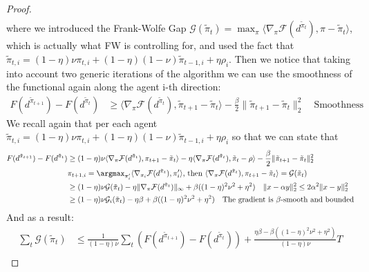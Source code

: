 \begin{proof}
\begin{align*}
    \end{align*}
    where we introduced the  Frank-Wolfe Gap $\mathcal G(\tilde \pi_{t})= \max_{\pi}\langle\nabla_{\pi}\mathcal F (d^{\tilde \pi_{t}}), \pi  - \tilde \pi_{t}\rangle$, which is actually what FW is controlling for, and used the fact that $\tilde \pi_{t,i} = (1-\eta)\nu \pi_{t,i} + (1-\eta)(1-\nu) \tilde \pi_{t-1,i} + \eta \rho_i$. Then we notice that taking into account two generic iterations of the algorithm we can use the smoothness of the functional again along the agent i-th direction:
    \begin{align*}
         F(d^{\tilde \pi_{t+1}}) -F(d^{\tilde \pi_{t}}) 
        &\geq  \langle\nabla_{\pi}\mathcal F (d^{\tilde \pi_{t}}),  \tilde \pi_{t+1}-\tilde \pi_{t}\rangle - \frac{\beta}{2}\|\tilde \pi_{t +1} - \tilde \pi_{t} \|_2^2\quad \text{Smoothness}
    \end{align*}
    We recall again that per each agent $\tilde \pi_{t,i} = (1-\eta)\nu \pi_{t,i} + (1-\eta)(1-\nu) \tilde \pi_{t-1,i} + \eta \rho_i$ so that we can state that 
    \begin{align*}
         F(d^{\tilde \pi_{t+1}}) -F(d^{\tilde \pi_{t}}) 
         &\geq (1-\eta)\nu  \langle\nabla_{\pi}\mathcal F (d^{\tilde \pi_{t}}), \pi_{t+1}- \tilde \pi_{t}\rangle -\eta  \langle\nabla_{\pi}\mathcal F (d^{\tilde \pi_{t}}),  \tilde \pi_{t}-\rho\rangle - \frac{\beta}{2} \| \tilde \pi_{t+1}-\tilde \pi_{t} \|_2^2 \\
         &\text{$\pi_{t+1,i} = \argmax_{\pi_i'}\langle \nabla_{\pi_i}\mathcal F (d^{\tilde \pi_{t}}), \pi_i'\rangle$, then $ \langle\nabla_{\pi}\mathcal F (d^{\tilde \pi_{t}}),  \pi_{ t+1}-\tilde \pi_{t}\rangle = \mathcal G(\tilde \pi_{t})$} \\
        &\geq (1-\eta)\nu \mathcal G(\tilde \pi_{t}) -\eta \|\nabla_{\pi}\mathcal F (d^{\tilde \pi_{t}}) \|_\infty +\beta ( (1-\eta)^2\nu^2 + \eta^2) \quad \text{$\|x-\alpha y\|_2^2\leq 2\alpha^2 \|x- y\|_2^2$}\\
        &\geq (1-\eta)\nu \mathcal G_i(\tilde \pi_{t}) -\eta \beta+\beta ( (1-\eta)^2\nu^2 + \eta^2)\quad \text{The gradient is $\beta$-smooth and bounded} 
    \end{align*}
    And as a result:
    \begin{align*}
         \sum_t \mathcal G(\tilde \pi_{t}) &\leq  \frac{1}{(1-\eta)\nu }\sum_t ( F(d^{\tilde \pi_{t+1}}) -F(d^{\tilde \pi_{t}}) ) + \frac{\eta \beta-\beta ( (1-\eta)^2\nu^2 + \eta^2)}{(1-\eta)\nu }T \\

\end{align*}
\end{proof}
